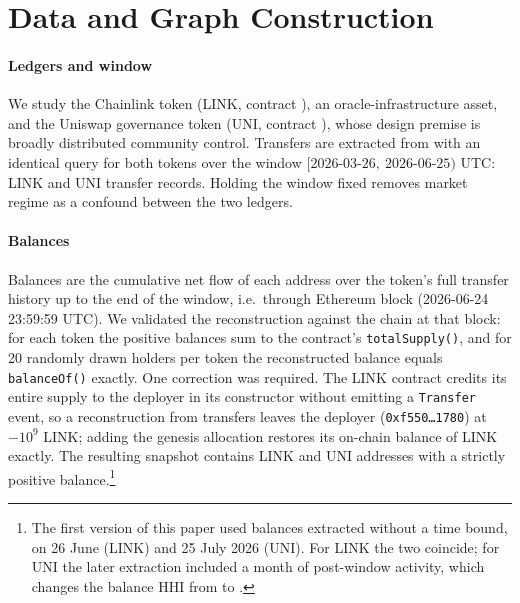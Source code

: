 \section{Data and Graph Construction}
\label{sec:data}

\paragraph{Ledgers and window}
We study the Chainlink token (LINK, contract
), an oracle-infrastructure
asset, and the Uniswap governance token (UNI, contract
), whose design premise is
broadly distributed community control. Transfers are extracted from
 with an
identical query for both tokens over the window
$[\text{2026-03-26},\ \text{2026-06-25})$ UTC:  LINK and
 UNI transfer records. Holding the window fixed removes market
regime as a confound between the two ledgers.

\paragraph{Balances}
Balances are the cumulative net flow of each address over the token's full
transfer history up to the end of the window, i.e.\ through Ethereum block
 (2026-06-24 23:59:59 UTC). We validated the reconstruction
against the chain at that block: for each token the positive balances sum to
the contract's \texttt{totalSupply()}, and for 20 randomly drawn holders per
token the reconstructed balance equals \texttt{balanceOf()} exactly. One
correction was required. The LINK contract credits its entire supply to the
deployer in its constructor without emitting a \texttt{Transfer} event, so a
reconstruction from transfers leaves the deployer
(\texttt{0xf550\ldots1780}) at $-10^{9}$ LINK; adding the genesis allocation
restores its on-chain balance of  LINK exactly. The
resulting snapshot contains  LINK and  UNI
addresses with a strictly positive balance.\footnote{The first version of
this paper used balances extracted without a time bound, on 26 June (LINK) and
25 July 2026 (UNI). For LINK the two coincide; for UNI the later extraction
included a month of post-window activity, which changes the balance HHI from
 to .}

